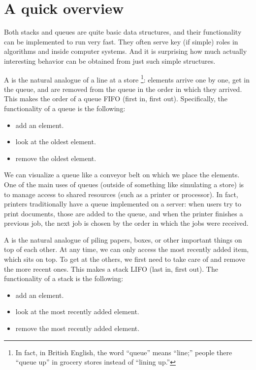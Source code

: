 \section{A quick overview}
Both stacks and queues are quite basic data structures,
and their functionality can be implemented to run very fast. 
They often serve key (if simple) roles in algorithms and inside
computer systems.
And it is surprising how much actually interesting
behavior can be obtained from just such simple structures.

A  is the natural analogue of a line at a store%
\footnote{In fact, in British English, the word ``queue'' means
  ``line;'' people there ``queue up'' in grocery stores instead of
  ``lining up.''}: 
elements arrive one by one, get in the queue, and are removed from the
queue in the order in which they arrived.
This makes the order of a queue FIFO (first in, first out).
Specifically, the functionality of a queue is the following:

\begin{itemize}
\item add an element.
\item look at the oldest element.
\item remove the oldest element.
\end{itemize}

We can visualize a queue like a conveyor belt on which we place the
elements.
One of the main uses of queues (outside of something like simulating a
store) is to manage access to shared resources (such as a printer or
processor).
In fact, printers traditionally have a queue implemented on a server:
when users try to print documents, those are added to the queue,
and when the printer finishes a previous job, the next job is chosen
by the order in which the jobs were received. 

\medskip

A  is the natural analogue of piling papers, boxes, or
other important things on top of each other.
At any time, we can only access the most recently added item,
which sits on top.
To get at the others, we first need to take care of and remove the
more recent ones. 
This makes a stack LIFO (last in, first out).
The functionality of a stack is the following:

\begin{itemize}
\item add an element.
\item look at the most recently added element.
\item remove the most recently added element.
\end{itemize}

